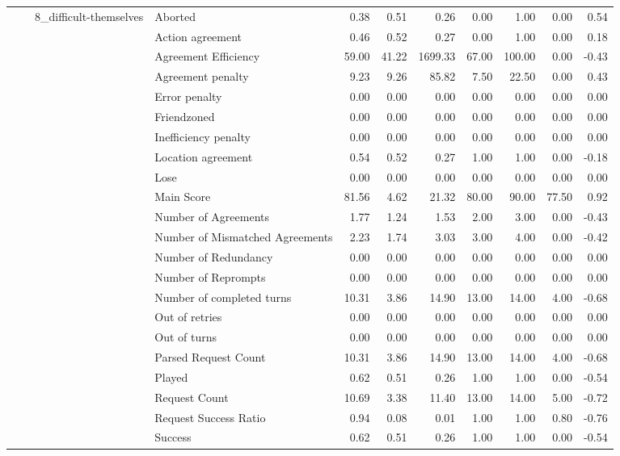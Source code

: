 \begin{tabular}{llllrrrrrrr}
\cline{3-11}
 &  & \multirow[t]{27}{*}{8_difficult-themselves} & Aborted & 0.38 & 0.51 & 0.26 & 0.00 & 1.00 & 0.00 & 0.54 \\
 &  &  & Action agreement & 0.46 & 0.52 & 0.27 & 0.00 & 1.00 & 0.00 & 0.18 \\
 &  &  & Agreement Efficiency & 59.00 & 41.22 & 1699.33 & 67.00 & 100.00 & 0.00 & -0.43 \\
 &  &  & Agreement penalty & 9.23 & 9.26 & 85.82 & 7.50 & 22.50 & 0.00 & 0.43 \\
 &  &  & Error penalty & 0.00 & 0.00 & 0.00 & 0.00 & 0.00 & 0.00 & 0.00 \\
 &  &  & Friendzoned & 0.00 & 0.00 & 0.00 & 0.00 & 0.00 & 0.00 & 0.00 \\
 &  &  & Inefficiency penalty & 0.00 & 0.00 & 0.00 & 0.00 & 0.00 & 0.00 & 0.00 \\
 &  &  & Location agreement & 0.54 & 0.52 & 0.27 & 1.00 & 1.00 & 0.00 & -0.18 \\
 &  &  & Lose & 0.00 & 0.00 & 0.00 & 0.00 & 0.00 & 0.00 & 0.00 \\
 &  &  & Main Score & 81.56 & 4.62 & 21.32 & 80.00 & 90.00 & 77.50 & 0.92 \\
 &  &  & Number of Agreements & 1.77 & 1.24 & 1.53 & 2.00 & 3.00 & 0.00 & -0.43 \\
 &  &  & Number of Mismatched Agreements & 2.23 & 1.74 & 3.03 & 3.00 & 4.00 & 0.00 & -0.42 \\
 &  &  & Number of Redundancy & 0.00 & 0.00 & 0.00 & 0.00 & 0.00 & 0.00 & 0.00 \\
 &  &  & Number of Reprompts & 0.00 & 0.00 & 0.00 & 0.00 & 0.00 & 0.00 & 0.00 \\
 &  &  & Number of completed turns & 10.31 & 3.86 & 14.90 & 13.00 & 14.00 & 4.00 & -0.68 \\
 &  &  & Out of retries & 0.00 & 0.00 & 0.00 & 0.00 & 0.00 & 0.00 & 0.00 \\
 &  &  & Out of turns & 0.00 & 0.00 & 0.00 & 0.00 & 0.00 & 0.00 & 0.00 \\
 &  &  & Parsed Request Count & 10.31 & 3.86 & 14.90 & 13.00 & 14.00 & 4.00 & -0.68 \\
 &  &  & Played & 0.62 & 0.51 & 0.26 & 1.00 & 1.00 & 0.00 & -0.54 \\
 &  &  & Request Count & 10.69 & 3.38 & 11.40 & 13.00 & 14.00 & 5.00 & -0.72 \\
 &  &  & Request Success Ratio & 0.94 & 0.08 & 0.01 & 1.00 & 1.00 & 0.80 & -0.76 \\
 &  &  & Success & 0.62 & 0.51 & 0.26 & 1.00 & 1.00 & 0.00 & -0.54 \\

\end{tabular}

